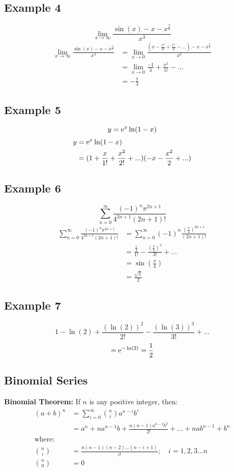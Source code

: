 \documentclass[letterpaper, 12pt]{math}
\begin{document}
\subsection*{Example 4}
\[ \lim_{x\to\infty}\frac{\sin(x)-x-x^{\frac{3}{6}}}{x^{3}} \]
\begin{align*}
  \lim_{x\to\infty}\frac{\sin(x)-x-x^{\frac{3}{6}}}{x^{3}} &=
    \lim_{x\to0}\frac{(x-\frac{x^{3}}{3!}+\frac{x^{5}}{5!}-...)
      -x-x^{\frac{3}{6}}}{x^{3}} \\
  &= \lim_{x\to0}\frac{-1}{3}+\frac{x^{2}}{5!}-... \\
  &= -\frac{1}{3}
\end{align*}

\subsection*{Example 5}
\[ y = \mathrm{e}^{x}\ln(1-x) \]
\begin{align*}
  y &= \mathrm{e}^{x}\ln(1-x) \\
  &= (1+\frac{x}{1!}+\frac{x^{2}}{2!}+...)(-x-\frac{x^{2}}{2}+...)
\end{align*}

\subsection*{Example 6}
\[ \sum_{n=0}^{\infty}\frac{(-1)^{n}\pi^{2n+1}}{4^{2n+1}(2n+1)!} \]
\begin{align*}
  \sum_{n=0}^{\infty}\frac{(-1)^{n}\pi^{2n+1}}{4^{2n+1}(2n+1)!}
    &= \sum_{n=0}^{\infty}(-1)^{n}\frac{(\frac{\pi}{4})^{2n+1}}{(2n+1)!} \\
  &= \frac{\frac{\pi}{4}}{1!}-\frac{(\frac{\pi}{4})^{3}}{3!}+... \\
  &= \sin(\frac{\pi}{4}) \\
  &= \frac{\sqrt{2}}{2}
\end{align*}

\subsection*{Example 7}
\[ 1-\ln(2)+\frac{(\ln(2))^{2}}{2!}-\frac{(\ln(3))^{3}}{3!}+... \]
\[ = \mathrm{e}^{-\ln(2)} = \frac{1}{2} \]

\subsection*{Binomial Series}
\textbf{Binomial Theorem:} If \( n \) is any positive integer, then:
\begin{align*}
  (a+b)^{n} &= \sum_{i=0}^{\infty}\binom{n}{i}a^{n-i}b^{i} \\
  &= a^{n}+na^{n-1}b+\frac{n(n-1)a^{n-2}b^{2}}{2!}+...+nab^{n-1}+b^{n} \\
  \mathrm{where:} \\
  \binom{n}{i} &= \frac{n(n-1)(n-2)...(n-i+1)}{i!}; \quad i=1,2,3...n \\
  \binom{n}{0} &= 0
\end{align*}
\end{document}

